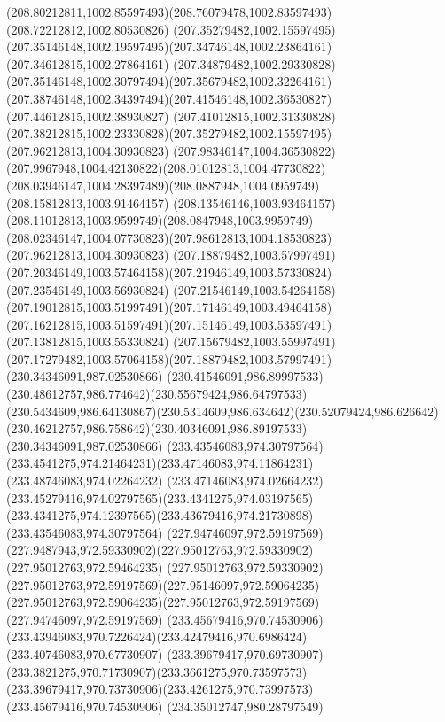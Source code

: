 {{		\curveto(208.80212811,1002.85597493)(208.76079478,1002.83597493)(208.72212812,1002.80530826)
		\moveto(207.35279482,1002.15597495)
		\curveto(207.35146148,1002.19597495)(207.34746148,1002.23864161)(207.34612815,1002.27864161)
		\curveto(207.34879482,1002.29330828)(207.35146148,1002.30797494)(207.35679482,1002.32264161)
		\curveto(207.38746148,1002.34397494)(207.41546148,1002.36530827)(207.44612815,1002.38930827)
		\curveto(207.41012815,1002.31330828)(207.38212815,1002.23330828)(207.35279482,1002.15597495)
		\moveto(207.96212813,1004.30930823)
		\curveto(207.98346147,1004.36530822)(207.9967948,1004.42130822)(208.01012813,1004.47730822)
		\curveto(208.03946147,1004.28397489)(208.0887948,1004.0959749)(208.15812813,1003.91464157)
		\curveto(208.13546146,1003.93464157)(208.11012813,1003.9599749)(208.0847948,1003.9959749)
		\curveto(208.02346147,1004.07730823)(207.98612813,1004.18530823)(207.96212813,1004.30930823)
		\moveto(207.18879482,1003.57997491)
		\curveto(207.20346149,1003.57464158)(207.21946149,1003.57330824)(207.23546149,1003.56930824)
		\curveto(207.21546149,1003.54264158)(207.19012815,1003.51997491)(207.17146149,1003.49464158)
		\curveto(207.16212815,1003.51597491)(207.15146149,1003.53597491)(207.13812815,1003.55330824)
		\curveto(207.15679482,1003.55997491)(207.17279482,1003.57064158)(207.18879482,1003.57997491)
		\moveto(230.34346091,987.02530866)
		\curveto(230.41546091,986.89997533)(230.48612757,986.774642)(230.55679424,986.64797533)
		\curveto(230.5434609,986.64130867)(230.5314609,986.634642)(230.52079424,986.626642)
		\curveto(230.46212757,986.758642)(230.40346091,986.89197533)(230.34346091,987.02530866)
		\moveto(233.43546083,974.30797564)
		\curveto(233.4541275,974.21464231)(233.47146083,974.11864231)(233.48746083,974.02264232)
		\curveto(233.47146083,974.02664232)(233.45279416,974.02797565)(233.4341275,974.03197565)
		\curveto(233.4341275,974.12397565)(233.43679416,974.21730898)(233.43546083,974.30797564)
		\moveto(227.94746097,972.59197569)
		\curveto(227.9487943,972.59330902)(227.95012763,972.59330902)(227.95012763,972.59464235)
		\curveto(227.95012763,972.59330902)(227.95012763,972.59197569)(227.95146097,972.59064235)
		\curveto(227.95012763,972.59064235)(227.95012763,972.59197569)(227.94746097,972.59197569)
		\moveto(233.45679416,970.74530906)
		\curveto(233.43946083,970.7226424)(233.42479416,970.6986424)(233.40746083,970.67730907)
		\curveto(233.39679417,970.69730907)(233.3821275,970.71730907)(233.3661275,970.73597573)
		\curveto(233.39679417,970.73730906)(233.4261275,970.73997573)(233.45679416,970.74530906)
		\moveto(234.35012747,980.28797549)
}}
